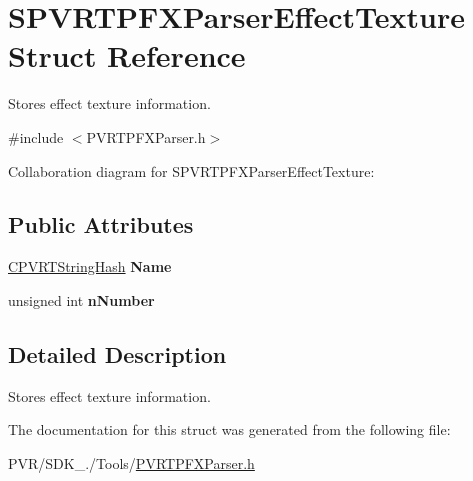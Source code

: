 \hypertarget{struct_s_p_v_r_t_p_f_x_parser_effect_texture}{\section{S\+P\+V\+R\+T\+P\+F\+X\+Parser\+Effect\+Texture Struct Reference}
\label{struct_s_p_v_r_t_p_f_x_parser_effect_texture}
}


Stores effect texture information.  




{\ttfamily \#include $<$P\+V\+R\+T\+P\+F\+X\+Parser.\+h$>$}



Collaboration diagram for S\+P\+V\+R\+T\+P\+F\+X\+Parser\+Effect\+Texture\+:
\subsection*{Public Attributes}
\begin{DoxyCompactItemize}
\item 
\hypertarget{struct_s_p_v_r_t_p_f_x_parser_effect_texture_a2021abd29524dfb29cc5ffbdec8666fb}{\hyperlink{class_c_p_v_r_t_string_hash}{C\+P\+V\+R\+T\+String\+Hash} {\bfseries Name}}\label{struct_s_p_v_r_t_p_f_x_parser_effect_texture_a2021abd29524dfb29cc5ffbdec8666fb}

\item 
\hypertarget{struct_s_p_v_r_t_p_f_x_parser_effect_texture_a773533dab1e81b9a2cbd41fc15679c02}{unsigned int {\bfseries n\+Number}}\label{struct_s_p_v_r_t_p_f_x_parser_effect_texture_a773533dab1e81b9a2cbd41fc15679c02}

\end{DoxyCompactItemize}


\subsection{Detailed Description}
Stores effect texture information. 



 

The documentation for this struct was generated from the following file\+:\begin{DoxyCompactItemize}
\item 
P\+V\+R/\+S\+D\+K\+\_./\+Tools/\hyperlink{_p_v_r_t_p_f_x_parser_8h}{P\+V\+R\+T\+P\+F\+X\+Parser.\+h}\end{DoxyCompactItemize}
